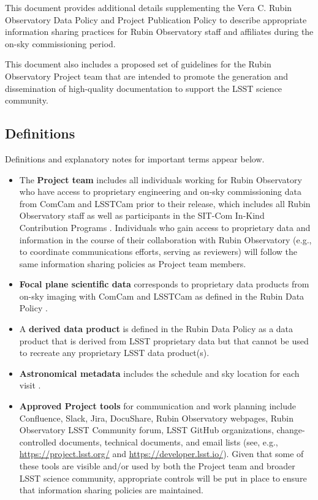 \documentclass[SE,authoryear,toc]{lsstdoc}
\begin{document}
This document provides additional details supplementing the Vera C. Rubin Observatory Data Policy  and Project Publication Policy  to describe appropriate information sharing practices for Rubin Observatory staff and affiliates during the on-sky commissioning period.

This document also includes a proposed set of guidelines for the Rubin Observatory Project team that are intended to promote the generation and dissemination of high-quality documentation to support the LSST science community.

\subsection{Definitions}
\label{definitions}

Definitions and explanatory notes for important terms appear below.

\begin{itemize}

  \item The \textbf{Project team} includes all individuals working for Rubin Observatory who have access to proprietary engineering and on-sky commissioning data from ComCam and LSSTCam prior to their release, which includes all Rubin Observatory staff as well as participants in the SIT-Com In-Kind Contribution Programs .
  Individuals who gain access to proprietary data and information in the course of their collaboration with Rubin Observatory (e.g., to coordinate communications efforts, serving as reviewers) will follow the same information sharing policies as Project team members.

  \item \textbf{Focal plane scientific data} corresponds to proprietary data products from on-sky imaging with ComCam and LSSTCam as defined in the Rubin Data Policy .

  \item A \textbf{derived data product} is defined in the Rubin Data Policy  as a data product that is derived from LSST proprietary data but that cannot be used to recreate any proprietary LSST data product(s).

  \item \textbf{Astronomical metadata} includes the schedule and sky location for each visit .

  \item \textbf{Approved Project tools} for communication and work planning include Confluence, Slack, Jira, DocuShare, Rubin Observatory webpages, Rubin Observatory LSST Community forum, LSST GitHub organizations, change-controlled documents, technical documents, and email lists (see, e.g., \url{https://project.lsst.org/} and \url{https://developer.lsst.io/}).
  Given that some of these tools are visible and/or used by both the Project team and broader LSST science community, appropriate controls will be put in place to ensure that information sharing policies are maintained.

\end{itemize}
\end{document}
